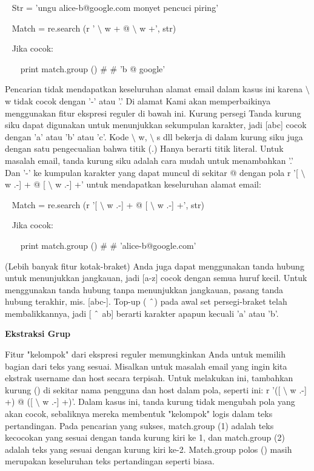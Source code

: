\begin {enumerate}
\begin {enumerate}
\vspace{12pt}
\noindent
~ Str = 'ungu alice-b@google.com monyet pencuci piring' \par
\noindent
~ Match = re.search (r ' $  \setminus  $ w + @  $  \setminus  $ w +', str) \par
\noindent
~ Jika cocok: \par
\noindent
~~~ print match.group ()  $  \#  $ $  \#  $ 'b @ google' \par
\vspace{12pt}
Pencarian tidak mendapatkan keseluruhan alamat email dalam kasus ini karena  $  \setminus  $ w tidak cocok dengan '-' atau '.' Di alamat Kami akan memperbaikinya menggunakan fitur ekspresi reguler di bawah ini. Kurung persegi Tanda kurung siku dapat digunakan untuk menunjukkan sekumpulan karakter, jadi [abc] cocok dengan 'a' atau 'b' atau 'c'. Kode  $  \setminus  $ w,  $  \setminus  $ s dll bekerja di dalam kurung siku juga dengan satu pengecualian bahwa titik (.) Hanya berarti titik literal. Untuk masalah email, tanda kurung siku adalah cara mudah untuk menambahkan '.' Dan '-' ke kumpulan karakter yang dapat muncul di sekitar @ dengan pola r '[ $  \setminus  $ w .-] + @ [ $  \setminus  $ w .-] +' untuk mendapatkan keseluruhan alamat email: \par
\vspace{12pt}
\noindent
~ Match = re.search (r '[ $  \setminus  $ w .-] + @ [ $  \setminus  $ w .-] +', str) \par
\noindent
~ Jika cocok: \par
\noindent
~~~ print match.group ()  $  \#  $ $  \#  $ 'alice-b@google.com' \par
\vspace{12pt}
(Lebih banyak fitur kotak-braket) Anda juga dapat menggunakan tanda hubung untuk menunjukkan jangkauan, jadi [a-z] cocok dengan semua huruf kecil. Untuk menggunakan tanda hubung tanpa menunjukkan jangkauan, pasang tanda hubung terakhir, mis. [abc-]. Top-up ( $  \string^  $) pada awal set persegi-braket telah membalikkannya, jadi [ $  \string^  $ ab] berarti karakter apapun kecuali 'a' atau 'b'. \par
\vspace{16pt}
{\fontsize{14pt}{14pt}\selectfont \textbf{Ekstraksi Grup} \\} \par
Fitur "kelompok" dari ekspresi reguler memungkinkan Anda untuk memilih bagian dari teks yang sesuai. Misalkan untuk masalah email yang ingin kita ekstrak username dan host secara terpisah. Untuk melakukan ini, tambahkan kurung () di sekitar nama pengguna dan host dalam pola, seperti ini: r '([ $  \setminus  $ w .-] +) @ ([ $  \setminus  $ w .-] +)'. Dalam kasus ini, tanda kurung tidak mengubah pola yang akan cocok, sebaliknya mereka membentuk "kelompok" logis dalam teks pertandingan. Pada pencarian yang sukses, match.group (1) adalah teks kecocokan yang sesuai dengan tanda kurung kiri ke 1, dan match.group (2) adalah teks yang sesuai dengan kurung kiri ke-2. Match.group polos () masih merupakan keseluruhan teks pertandingan seperti biasa. \par

\end{enumerate}
\end{enumerate}
